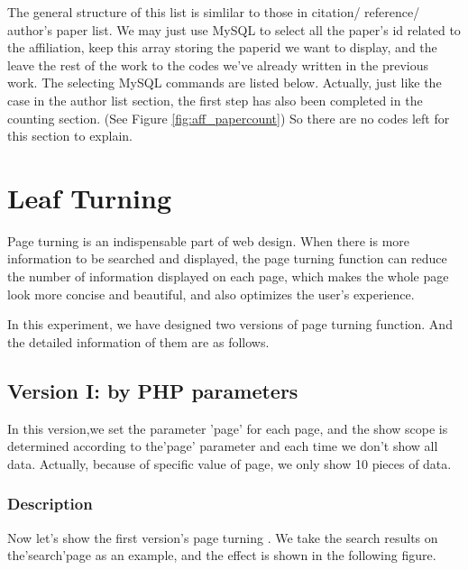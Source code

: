 \documentclass{book}
\begin{document}
The general structure of this list is simlilar to those in citation/ reference/ author's paper list. We may just use MySQL to select all the paper's id related to the affiliation, keep this array storing the paperid we want to display, and the leave the rest of the work to the codes we've already written in the previous work. The selecting MySQL commands are listed below. Actually, just like the case in the author list section, the first step has also been completed in the counting section. (See Figure \ref{fig:aff_papercount}) So there are no codes left for this section to explain.

\chapter{Leaf Turning}

Page turning is an indispensable part of web design. When there is more information to be searched and displayed, the page turning function can reduce the number of information displayed on each page, which makes the whole page look more concise and beautiful, and also optimizes the user's experience.

In this experiment, we have designed two versions of page turning function. And the detailed information of them are as follows.

\section{Version I: by PHP parameters}
In this version,we set the parameter 'page' for each page, and the show scope is determined according to the'page' parameter and each time we don't show all data. Actually, because of specific value of page, we only show 10 pieces of data.
\subsection{Description}
Now let's show the first version's page turning . We take the search results on the'search'page as an example, and the effect is shown in the following figure.
\end{document}
